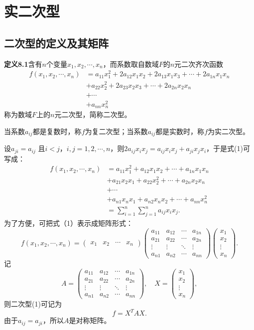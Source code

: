 \section{实二次型}
\subsection{二次型的定义及其矩阵}
\textbf{定义8.1}\quad 含有$n$个变量$x_1,x_2,\cdots,x_n$，而系数取自数域$F$的$n$元二次齐次函数
\[
\begin{aligned}
f(x_1, x_2, \cdots, x_n) &= a_{11}x_1^2 + 2a_{12}x_1x_2 + 2a_{13}x_1x_3 + \cdots + 2a_{1n}x_1x_n \\
&+ a_{22}x_2^2 + 2a_{23}x_2x_3 + \cdots + 2a_{2n}x_2x_n \\
&+ \cdots \\
&+ a_{nn}x_n^2
\end{aligned}\tag{1}
\]
称为数域$F$上的$n$元二次型，简称二次型。

当系数$a_{ij}$都是复数时，称$f$为复二次型；当系数$a_{ij}$都是实数时，称$f$为实二次型。

设$a_{ji} = a_{ij}$ 且$i < j$，$i, j = 1, 2, \cdots, n$，则$2a_{ij}x_i x_j = a_{ij}x_i x_j + a_{ji}x_j x_i$，于是式(1)可写成：
\[
\begin{aligned}
f(x_1, x_2, \cdots, x_n) &= a_{11}x_1^2 + a_{12}x_1x_2 + \cdots + a_{1n}x_1x_n \\
&+ a_{21}x_2x_1 + a_{22}x_2^2 + \cdots + a_{2n}x_2x_n \\
&+ \cdots \\
&+ a_{n1}x_nx_1 + a_{n2}x_nx_2 + \cdots + a_{nn}x_n^2 \\
&= \sum_{i=1}^{n} \sum_{j=1}^{n} a_{ij}x_i x_j.
\end{aligned}\tag{2}
\]
为了方便，可把式（1）表示成矩阵形式：
\[
f(x_1, x_2, \cdots, x_n)
=
\begin{pmatrix} x_1 & x_2 & \cdots & x_n \end{pmatrix}
\begin{pmatrix}
a_{11} & a_{12} & \cdots & a_{1n} \\
a_{21} & a_{22} & \cdots & a_{2n} \\
\vdots & \vdots & \ddots & \vdots \\
a_{n1} & a_{n2} & \cdots & a_{nn}
\end{pmatrix}
\begin{pmatrix} x_1 \\ x_2 \\ \vdots \\ x_n \end{pmatrix}.
\]
记
\[
A = \begin{pmatrix}
a_{11} & a_{12} & \cdots & a_{1n} \\
a_{21} & a_{22} & \cdots & a_{2n} \\
\vdots & \vdots & \ddots & \vdots \\
a_{n1} & a_{n2} & \cdots & a_{nn}
\end{pmatrix},
\quad
X = \begin{pmatrix} x_1 \\ x_2 \\ \vdots \\ x_n \end{pmatrix},
\]
则二次型(1)可记为
\[
f = X^T A X. \tag{3}
\]
由于$a_{ij}=a_{ji}$，所以$A$是对称矩阵。

